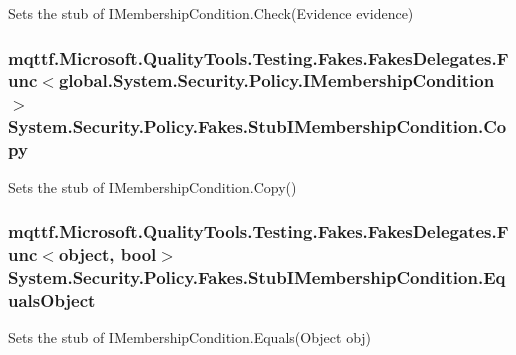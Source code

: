 Sets the stub of I\-Membership\-Condition.\-Check(\-Evidence evidence)

\hypertarget{class_system_1_1_security_1_1_policy_1_1_fakes_1_1_stub_i_membership_condition_a08b5b42d946f303ac1fe3d8d9c3acf94}{
\subsubsection[{Copy}]{\setlength{\rightskip}{0pt plus 5cm}mqttf.\-Microsoft.\-Quality\-Tools.\-Testing.\-Fakes.\-Fakes\-Delegates.\-Func$<$global.\-System.\-Security.\-Policy.\-I\-Membership\-Condition$>$ System.\-Security.\-Policy.\-Fakes.\-Stub\-I\-Membership\-Condition.\-Copy}}\label{class_system_1_1_security_1_1_policy_1_1_fakes_1_1_stub_i_membership_condition_a08b5b42d946f303ac1fe3d8d9c3acf94}


Sets the stub of I\-Membership\-Condition.\-Copy()

\hypertarget{class_system_1_1_security_1_1_policy_1_1_fakes_1_1_stub_i_membership_condition_a60e1201c9995052ddee9b410fbf4eaba}{
\subsubsection[{Equals\-Object}]{\setlength{\rightskip}{0pt plus 5cm}mqttf.\-Microsoft.\-Quality\-Tools.\-Testing.\-Fakes.\-Fakes\-Delegates.\-Func$<$object, bool$>$ System.\-Security.\-Policy.\-Fakes.\-Stub\-I\-Membership\-Condition.\-Equals\-Object}}\label{class_system_1_1_security_1_1_policy_1_1_fakes_1_1_stub_i_membership_condition_a60e1201c9995052ddee9b410fbf4eaba}


Sets the stub of I\-Membership\-Condition.\-Equals(\-Object obj)

